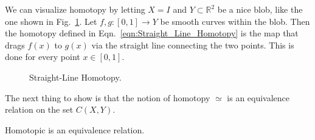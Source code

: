 \documentclass[crop=false,class=book,oneside]{standalone}                      %
\begin{document}
            We can visualize homotopy by letting $X=I$ and
            $Y\subset\mathbb{R}^{2}$ be a nice blob, like the one shown in
            Fig.~\ref{fig:straight_line_homotopy}. Let
            $f,g:[0,1]\rightarrow Y$ be smooth curves within the blob. Then
            the homotopy defined in Eqn.~\ref{eqn:Straight_Line_Homotopy} is
            the map that drags $f(x)$ to $g(x)$ via the straight line connecting
            the two points. This is done for every point $x\in [0,1]$.
            \begin{figure}[H]
                \centering
                \captionsetup{type=figure}
                
                \caption{Straight-Line Homotopy.}
                \label{fig:straight_line_homotopy}
            \end{figure}
            The next thing to show is that the notion of homotopy $\simeq$
            is an equivalence relation on the set $C(X,Y)$.
            \begin{theorem}
                Homotopic is an equivalence relation.
            \end{theorem}
\end{document}

